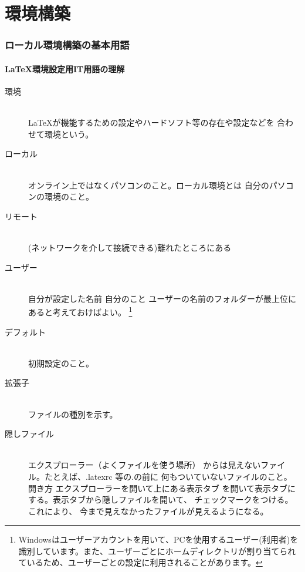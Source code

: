 \documentclass[titlepage]{ltjsarticle}
\begin{document}
\part{環境構築}
\section{ローカル環境構築の基本用語}
\subsection{\LaTeX 環境設定用IT用語の理解}

\begin{description}
  \item [環境] ~\\
    \LaTeX が機能するための設定やハードソフト等の存在や設定などを
    合わせて環境という。
  \item [ローカル] ~\\
    オンライン上ではなくパソコンのこと。ローカル環境とは
    自分のパソコンの環境のこと。
    
   
  \item[リモート] ~\\
    (ネットワークを介して接続できる)離れたところにある 
  \item [ユーザー] ~\\
    自分が設定した名前 自分のこと
    ユーザーの名前のフォルダーが最上位にあると考えておけばよい。
    \footnote{Windowsはユーザーアカウントを用いて、PCを使用するユーザー(利用者)を識別しています。また、ユーザーごとにホームディレクトリが割り当てられているため、ユーザーごとの設定に利用されることがあります。}


  \item [デフォルト] ~\\
    初期設定のこと。
  \item[拡張子] ~\\
    ファイルの種別を示す。
  \item [隠しファイル] ~\\
    エクスプローラー（よくファイルを使う場所）
    からは見えないファイル。たとえば、.latexrc 等の.の前に
    何もついていないファイルのこと。
    開き方 エクスプローラーを開いて上にある表示タブ
    を開いて表示タブにする。表示タブから隠しファイルを開いて、
    チェックマークをつける。これにより、
    今まで見えなかったファイルが見えるようになる。


\end{description}
\end{document}

